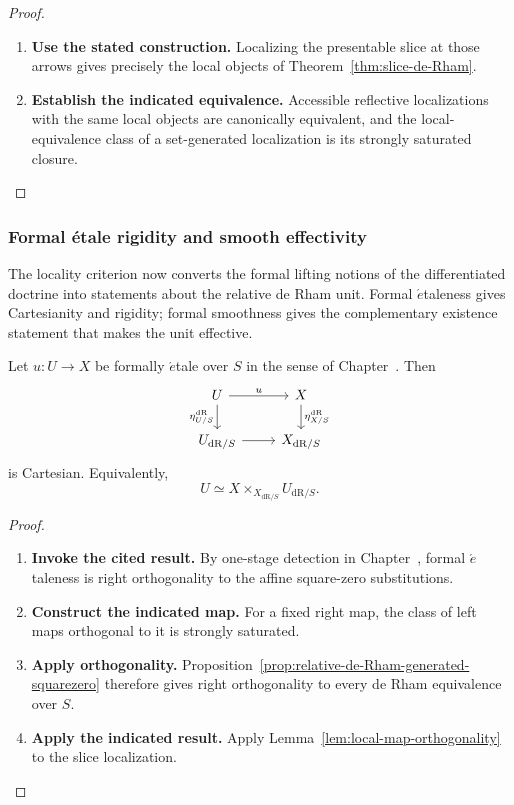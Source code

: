 \begin{proof}
\leavevmode
\begin{enumerate}[label=\textup{(\arabic*)}]
    \item \textbf{Use the stated construction.}
    Localizing the presentable slice at those arrows gives precisely the local objects of
    Theorem~\ref{thm:slice-de-Rham}.
    \item \textbf{Establish the indicated equivalence.}
    Accessible reflective localizations with the same
    local objects are canonically equivalent, and the local-equivalence class of a
    set-generated localization is its strongly saturated closure.
\end{enumerate}
\end{proof}

\subsubsection{Formal \texorpdfstring{\'etale}{etale} rigidity and smooth effectivity}

The locality criterion now converts the formal lifting notions of the
differentiated doctrine into statements about the relative de Rham unit.
Formal \(\acute{e}\)taleness gives Cartesianity and rigidity; formal smoothness
gives the complementary existence statement that makes the unit effective.

\begin{theorem}
\label{thm:formal-etale-cartesianity}
Let \(u:U\to X\) be formally \(\acute{e}\)tale over \(S\) in the sense of
Chapter~. Then
\[
\begin{tikzcd}
U \ar[r,"u"] \ar[d,"\eta_{U/S}^{\mathrm{dR}}"'] & X \ar[d,"\eta_{X/S}^{\mathrm{dR}}"]\\
U_{\mathrm{dR}/S} \ar[r] & X_{\mathrm{dR}/S}
\end{tikzcd}
\]
is Cartesian. Equivalently,
\[
  U
  \simeq
  X\times_{X_{\mathrm{dR}/S}}U_{\mathrm{dR}/S}.
\]
\end{theorem}

\begin{proof}
\leavevmode
\begin{enumerate}[label=\textup{(\arabic*)}]
    \item \textbf{Invoke the cited result.}
    By one-stage detection in
    Chapter~, formal
    \(\acute{e}\)taleness is right orthogonality to the affine square-zero
    substitutions.
    \item \textbf{Construct the indicated map.}
    For a fixed right map, the class of left maps orthogonal to it is
    strongly saturated.
    \item \textbf{Apply orthogonality.}
    Proposition~\ref{prop:relative-de-Rham-generated-squarezero}
    therefore gives right orthogonality to every de Rham equivalence over \(S\).
    \item \textbf{Apply the indicated result.}
    Apply
    Lemma~\ref{lem:local-map-orthogonality} to the slice localization.
\end{enumerate}
\end{proof}

